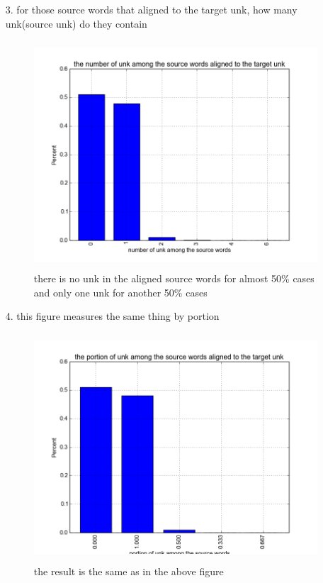 \documentclass{article}
\begin{document}
\begin{itemize}
\item[3. ] for those source words that aligned to the target unk, how many unk(source unk) do they contain  
\begin{figure}[H]
\centering
\includegraphics[height=8.5cm]{figure_2.png}
\caption{there is no unk in the aligned source words for almost 50\% cases and only one unk for another 50\% cases}
\end{figure}

\item[4. ] this figure measures the same thing by portion
\begin{figure}[H]
\centering
\includegraphics[height=8.5cm]{figure_3.png}
\caption{the result is the same as in the above figure}
\end{figure}


\end{itemize}
\end{document}
